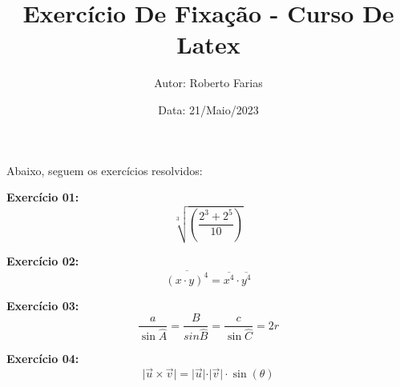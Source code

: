 \documentclass[a4paper,12pt]{article}
\title{\textbf{Exercício De Fixação - Curso De Latex}}
\author{Autor: Roberto Farias}
\date{Data: 21/Maio/2023}
\begin{document}
\maketitle %

Abaixo, seguem os exercícios resolvidos:

\vspace{1cm}

\textbf{Exercício 01:}
\begin{equation}
	\sqrt[3]{\left(\frac{2^3+2^5}{10}\right)}
\end{equation}

\textbf{Exercício 02:}
\begin{equation}
	\overline{(x \cdot y)^4}=\overline{x^4} \cdot \overline{y^4}
\end{equation}

\textbf{Exercício 03:}
\begin{equation}
	\frac{a}{\sin \widehat{A}}=\frac{B}{sin \widehat{B}}=\frac{c}{\sin \widehat{C}}=2r
\end{equation}

\textbf{Exercício 04:}
\begin{equation}
	\vert \vec{u} \times \vec{v} \vert = \vert \vec{u} \vert \cdot \vert \vec{v} \vert \cdot \sin (\theta)
\end{equation}
\end{document}
